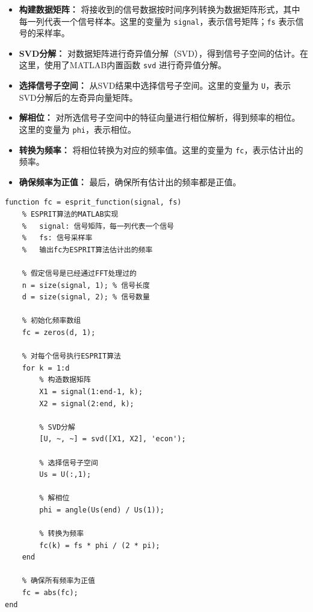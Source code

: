 \documentclass[a4paper,12pt]{article}
\begin{document}
\begin{itemize}
    \item \textbf{构建数据矩阵：} 将接收到的信号数据按时间序列转换为数据矩阵形式，其中每一列代表一个信号样本。这里的变量为 \texttt{signal}，表示信号矩阵；\texttt{fs} 表示信号的采样率。
    
    \item \textbf{SVD分解：} 对数据矩阵进行奇异值分解（SVD），得到信号子空间的估计。在这里，使用了MATLAB内置函数 \texttt{svd} 进行奇异值分解。
    
    \item \textbf{选择信号子空间：} 从SVD结果中选择信号子空间。这里的变量为 \texttt{U}，表示SVD分解后的左奇异向量矩阵。
    
    \item \textbf{解相位：} 对所选信号子空间中的特征向量进行相位解析，得到频率的相位。这里的变量为 \texttt{phi}，表示相位。
    
    \item \textbf{转换为频率：} 将相位转换为对应的频率值。这里的变量为 \texttt{fc}，表示估计出的频率。
    
    \item \textbf{确保频率为正值：} 最后，确保所有估计出的频率都是正值。
\end{itemize}

\begin{lstlisting}
function fc = esprit_function(signal, fs)
    % ESPRIT算法的MATLAB实现
    %   signal: 信号矩阵，每一列代表一个信号
    %   fs: 信号采样率
    %   输出fc为ESPRIT算法估计出的频率

    % 假定信号是已经通过FFT处理过的
    n = size(signal, 1); % 信号长度
    d = size(signal, 2); % 信号数量

    % 初始化频率数组
    fc = zeros(d, 1);

    % 对每个信号执行ESPRIT算法
    for k = 1:d
        % 构造数据矩阵
        X1 = signal(1:end-1, k);
        X2 = signal(2:end, k);

        % SVD分解
        [U, ~, ~] = svd([X1, X2], 'econ');

        % 选择信号子空间
        Us = U(:,1);

        % 解相位
        phi = angle(Us(end) / Us(1));

        % 转换为频率
        fc(k) = fs * phi / (2 * pi);
    end

    % 确保所有频率为正值
    fc = abs(fc);
end

\end{lstlisting}
\end{document}
